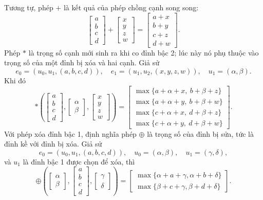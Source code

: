 \documentclass[11pt]{article}
\begin{document}
Tương tự, phép \(+\) là kết quả của phép chồng cạnh song song:
\[
  \begin{bmatrix}a\\b\\c\\d\end{bmatrix}
  +
  \begin{bmatrix}x\\y\\z\\w\end{bmatrix}
  =
  \begin{bmatrix}a+x\\b+y\\c+z\\d+w\end{bmatrix}.
\]
Phép \(\ast\) là trọng số cạnh mới sinh ra khi co đỉnh bậc 2; lúc này nó phụ
thuộc vào trọng số của một đỉnh bị xóa và hai cạnh. Giả sử
\[
e_0=(u_0,u_1,(a,b,c,d)),\quad
e_1=(u_1,u_2,(x,y,z,w)),\quad u_1=(\alpha,\beta).
\]
Khi đó
\[
\ast\left(
\begin{bmatrix}a\\b\\c\\d\end{bmatrix},
\begin{bmatrix}\alpha\\\beta\end{bmatrix},
\begin{bmatrix}x\\y\\z\\w\end{bmatrix}
\right)
=
\begin{bmatrix}
\max\{a+\alpha+x,\ b+\beta+z\}\\
\max\{a+\alpha+y,\ b+\beta+w\}\\
\max\{c+\alpha+x,\ d+\beta+z\}\\
\max\{c+\alpha+y,\ d+\beta+w\}
\end{bmatrix}.
\]
Với phép xóa đỉnh bậc 1, định nghĩa phép \(\oplus\) là trọng số của đỉnh bị
sửa, tức là đỉnh kề với đỉnh bị xóa. Giả sử
\[
e_0=(u_0,u_1,(a,b,c,d)),\quad
u_0=(\alpha,\beta),\quad u_1=(\gamma,\delta),
\]
và \(u_1\) là đỉnh bậc 1 được chọn để xóa, thì
\[
\oplus\left(
\begin{bmatrix}\alpha\\\beta\end{bmatrix},
\begin{bmatrix}a\\b\\c\\d\end{bmatrix},
\begin{bmatrix}\gamma\\\delta\end{bmatrix}
\right)
=
\begin{bmatrix}
\max\{\alpha+a+\gamma,\alpha+b+\delta\}\\
\max\{\beta+c+\gamma,\beta+d+\delta\}
\end{bmatrix}.
\]
\end{document}
